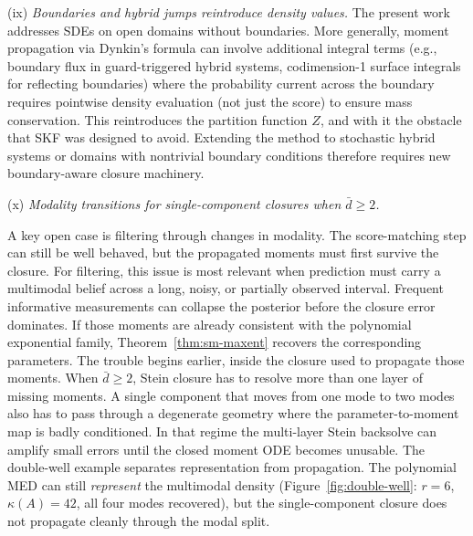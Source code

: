 \documentclass{article}
\theoremstyle{definition}
\begin{document}
(ix) \emph{Boundaries and hybrid jumps reintroduce density values.}
The present work addresses SDEs on open domains without boundaries.
More generally, moment propagation via Dynkin's formula can involve
additional integral terms (e.g., boundary flux in guard-triggered
hybrid systems, codimension-1 surface integrals for reflecting
boundaries) where the probability current across the boundary
requires pointwise density evaluation (not just the score)
to ensure mass conservation. This reintroduces the partition function
$Z$, and with it the obstacle that SKF was designed to avoid. Extending
the method to stochastic hybrid systems or domains with nontrivial
boundary conditions therefore requires new boundary-aware closure
machinery.

(x) \emph{Modality transitions for single-component closures when
$\bar{d} \ge 2$.}
\label{item:dbar2}

A key open case is filtering through changes in modality. The
score-matching step can still be well behaved, but the propagated moments
must first survive the closure. For filtering, this issue is most relevant
when prediction must carry a multimodal belief across a long, noisy, or
partially observed interval. Frequent informative measurements can collapse
the posterior before the closure error dominates. If those moments are
already consistent with the polynomial exponential family,
Theorem~\ref{thm:sm-maxent} recovers the corresponding parameters. The
trouble begins earlier, inside the closure used to propagate those
moments. When $\bar{d}\ge 2$, Stein closure has to resolve more than
one layer of missing moments. A single component that moves from one
mode to two modes also has to pass through a degenerate geometry where
the parameter-to-moment map is badly conditioned. In that regime the
multi-layer Stein backsolve can amplify small errors until the closed
moment ODE becomes unusable.
The double-well example separates representation from propagation. The
polynomial MED can still \emph{represent} the multimodal density
(Figure~\ref{fig:double-well}: $r{=}6$, $\kappa(A){=}42$, all four modes
recovered), but the single-component closure does not propagate cleanly
through the modal split.
\end{document}
